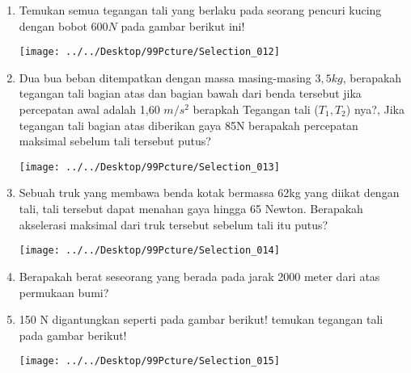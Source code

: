 \documentclass[12pt,a4paper,draft,final,oneside,twoside,openright,openany]{article}
\begin{document}
	\noindent\makebox[\linewidth]{\rule{\paperwidth}{0.4pt}}
	\begin{enumerate}
		\item Temukan semua tegangan tali yang berlaku pada seorang pencuri kucing dengan bobot $600 N$ pada gambar berikut ini!		
		\begin{center}
		\texttt{[image: ../../Desktop/99Pcture/Selection\_012]}
		\end{center}
		\item Dua bua beban ditempatkan dengan massa masing-masing $3,5kg$, berapakah tegangan tali bagian atas dan bagian bawah dari benda tersebut jika percepatan awal adalah 1,60 $m/s^2$ berapkah Tegangan tali ($T_1, T_2$) nya?, Jika tegangan tali bagian atas diberikan gaya 85N berapakah percepatan maksimal sebelum tali tersebut putus?		
		\begin{center}
		\texttt{[image: ../../Desktop/99Pcture/Selection\_013]}
		\end{center}
		\item Sebuah truk yang membawa benda kotak bermassa 62kg yang diikat dengan tali, tali tersebut dapat menahan gaya hingga 65 Newton. Berapakah akselerasi maksimal dari truk tersebut sebelum tali itu putus?
		\begin{center}
		\texttt{[image: ../../Desktop/99Pcture/Selection\_014]}
		\end{center}
		\item Berapakah berat seseorang yang berada pada jarak 2000 meter dari atas permukaan bumi?
		\item 150 N digantungkan seperti pada gambar berikut! temukan tegangan tali pada gambar berikut!
				\begin{center}
					\texttt{[image: ../../Desktop/99Pcture/Selection\_015]}
				\end{center}
	\end{enumerate}
	
\end{document}
